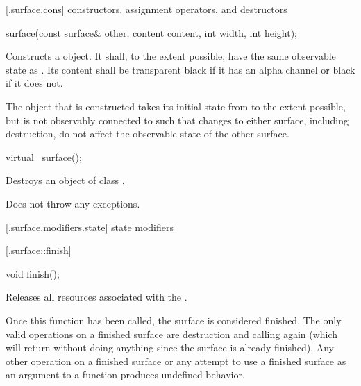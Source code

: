  [\iotwod.surface.cons] { constructors, assignment operators, and destructors}

%
\begin{itemdecl}
surface(const surface& other, content content, int width, int height);
\end{itemdecl}
\begin{itemdescr}
	\pnum
	\effects
	Constructs a  object. It shall, to the extent possible, have the same observable state as . Its content shall be transparent black if it has an alpha channel or black if it does not.
	
	\pnum
	\remarks
	The  object that is constructed takes its initial state from  to the extent possible, but is not observably connected to  such that changes to either surface, including destruction, do not affect the observable state of the other surface.
\end{itemdescr}

%
\begin{itemdecl}
virtual ~surface();
\end{itemdecl}
\begin{itemdescr}
	\pnum
	\effects
	Destroys an object of class .
	
	\pnum
	\remarks
	Does not throw any exceptions.
\end{itemdescr}

 [\iotwod.surface.modifiers.state] { state modifiers}

 [\iotwod.surface::finish] {}

%
%
\begin{itemdecl}
void finish();
\end{itemdecl}
\begin{itemdescr}
	\pnum
	\effects
	Releases all resources associated with the .
	
	\pnum
	\remarks
	Once this function has been called, the surface is considered finished. The only valid operations on a finished surface are destruction and calling  again (which will return without doing anything since the surface is already finished). Any other operation on a finished surface or any attempt to use a finished surface as an argument to a function produces undefined behavior.
\end{itemdescr}

